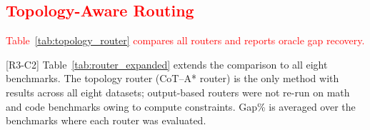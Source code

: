 \documentclass[11pt]{article}
\begin{document}
\textcolor{red}{\subsection{Topology-Aware Routing}
\label{sec:topology_routing}}

\textcolor{red}{Table~\ref{tab:topology_router} compares all routers and reports oracle gap recovery.}

\begin{table}[t]
\centering
\small
{}
\caption{\textcolor{red}{Router comparison with oracle gap recovery. Gap\% $= \frac{\text{Router} - \text{BestSingle}}{\text{Oracle} - \text{BestSingle}} \times 100$, averaged across datasets, where BestSingle $= \max(\text{CoT}, \text{A}^*)$ per dataset. The topology router observes no generated traces yet outperforms output-based routers on all three benchmarks.}}
\label{tab:topology_router}
\end{table}

\textcolor{reviewerpurple}{[R3-C2] Table~\ref{tab:router_expanded} extends the comparison to all eight benchmarks. The topology router (CoT--A* router) is the only method with results across all eight datasets; output-based routers were not re-run on math and code benchmarks owing to compute constraints. Gap\% is averaged over the benchmarks where each router was evaluated.}
\end{document}
